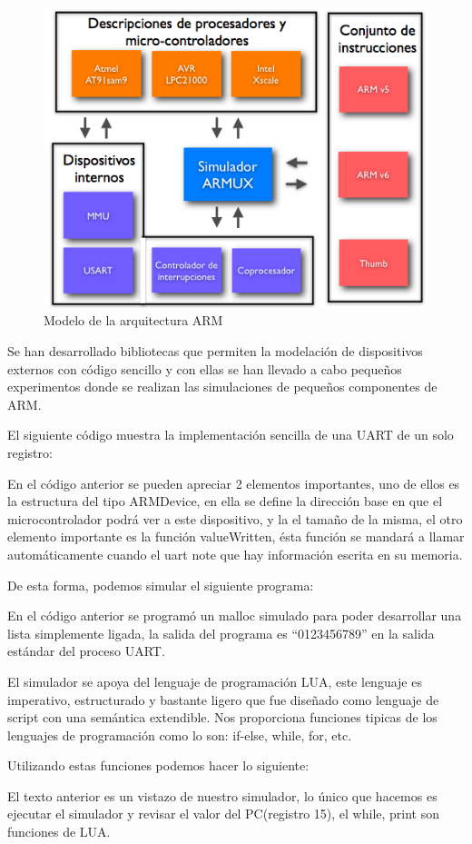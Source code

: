 \begin{figure}[H]
\centering
\includegraphics[scale=0.4]{figura_arq}
\caption{Modelo de la arquitectura ARM}\label{fig:arquitecture}
\end{figure}

Se han desarrollado bibliotecas que permiten la modelaci\'on de dispositivos externos con c\'odigo sencillo y con ellas se han llevado a cabo peque\~nos experimentos donde se realizan las simulaciones de peque\~nos componentes de ARM.\medskip

El siguiente c\'odigo muestra la implementaci\'on sencilla de una UART de un solo registro:\bigskip

\lstset{language=C}


En el c\'odigo anterior se pueden apreciar 2 elementos importantes, uno de ellos es la estructura del tipo ARMDevice, en ella se define la direcci\'on base en que el microcontrolador podr\'a ver a este dispositivo, y la el tamaño de la misma, el otro elemento importante es la funci\'on valueWritten, \'esta funci\'on se mandar\'a a llamar autom\'aticamente cuando el uart note que hay informaci\'on escrita en su memoria.\medskip

De esta forma, podemos simular el siguiente programa:\bigskip



En el c\'odigo anterior se program\'o un malloc simulado para poder desarrollar una lista simplemente ligada, la salida del programa es “0123456789” en la salida estándar del proceso UART.\medskip

El simulador se apoya del lenguaje de programaci\'on LUA, este lenguaje es imperativo, estructurado y bastante ligero que fue dise\~nado como lenguaje de script con una sem\'antica extendible. Nos proporciona funciones tipicas de los lenguajes de programaci\'on como lo son: if-else, while, for, etc.\medskip

Utilizando estas funciones podemos hacer lo siguiente:\medskip



El texto anterior es un vistazo de nuestro simulador, lo \'unico que hacemos es ejecutar el simulador y revisar el valor del PC(registro 15), el while, print son funciones de LUA.
